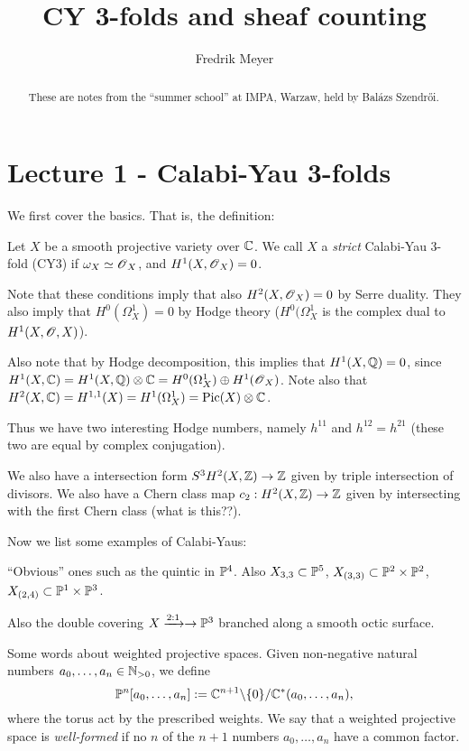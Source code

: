 \documentclass[11pt, english]{article}
\begin{document}
\title{CY 3-folds and sheaf counting}
\author{Fredrik Meyer}
\maketitle 

\begin{abstract}
These are notes from the ``summer school'' at IMPA, Warzaw, held by Balázs Szendrői.
\end{abstract}

\section{Lecture 1 - Calabi-Yau 3-folds}

We first cover the basics. That is, the definition:

Let $X$ be a smooth projective variety over $\mathbb{C}$. We call $X$ a \emph{strict} Calabi-Yau 3-fold (CY3) if $\omega_X \simeq \operatorname{\mathscr{O}}_X$, and $H^1(X,\operatorname{\mathscr{O}}_X)=0$.

Note that these conditions imply that also $H^2(X,\operatorname{\mathscr{O}}_X) = 0$ by Serre duality. They also imply that $H^0(\Omega_X^1)=0$ by Hodge theory ($H^0(\Omega_X^1$ is the complex dual to $H^1(X,\operatorname{\mathscr{O}},X)$).

Also note that by Hodge decomposition, this implies that $H^1(X,\mathbb{Q}) = 0$, since $H^1(X,\mathbb{C}) = H^1 (X, \mathbb{Q}) \otimes \mathbb{C} =  H^0(\Omega_X^1) \oplus H^1(\operatorname{\mathscr{O}}_X)$. Note also that $H^2(X,\mathbb{C}) = H^{1,1}(X) = H^1(\Omega^1_X) = \operatorname{Pic}(X) \otimes \mathbb{C}$.

Thus we have two interesting Hodge numbers, namely $h^{11}$ and $h^{12}=h^{21}$ (these two are equal by complex conjugation). 

We also have a intersection form $S^3 H^2(X,\mathbb{Z}) \to \mathbb{Z}$ given by triple intersection of divisors. We also have a Chern class map $c_2:H^2(X, \mathbb{Z}) \to \mathbb{Z}$ given by intersecting with the first Chern class (what is this??).

Now we list some examples of Calabi-Yaus:

\begin{example}
``Obvious'' ones such as the quintic in $\mathbb{P}^4$. Also $X_{3,3} \subset \mathbb{P}^5$, $X_{(3,3)} \subset \mathbb{P}^2 \times \mathbb{P}^2$, $X_{(2,4)} \subset \mathbb{P}^1 \times \mathbb{P}^3$.

Also the double covering $X \xrightarrow{2:1} \to \mathbb{P}^3$ branched along a smooth octic surface. 
\end{example}

\begin{remark}
Some words about weighted projective spaces. Given non-negative natural numbers $a_0,\ldots,a_n \in \mathbb{N}_{>0}$, we define
$$
\mathbb{P}^n[a_0,\ldots,a_n] := \mathbb{C}^{n+1} \backslash \{0\} / \mathbb{C}^\ast(a_0,\ldots,a_n),
$$
where the torus act by the prescribed weights. We say that a weighted projective space is \emph{well-formed} if no $n$ of the $n+1$ numbers $a_0,\ldots,a_n$ have a common factor.
\end{remark}
\end{document}
